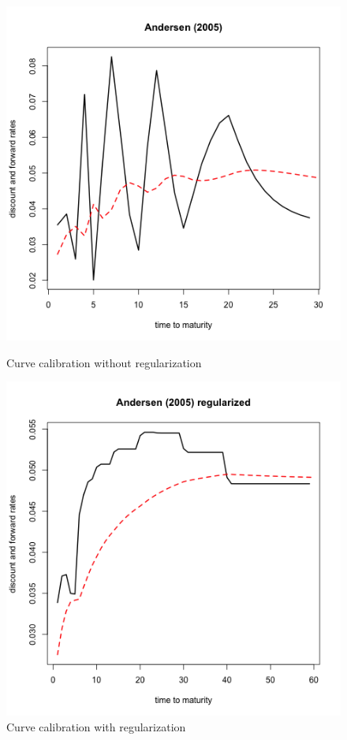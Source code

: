   \begin{figure}[!htb]
    \centering
    \begin{minipage}{.5\textwidth}
        \centering
        \includegraphics[width=1.05\linewidth, height=0.35\textheight]{gfx/chapter-yc-insurance/construction_graph7}
        \caption{Curve calibration without regularization}
        \label{fig:andersen2007examples1}
    \end{minipage}%
    \begin{minipage}{0.5\textwidth}
        \centering
        \includegraphics[width=1.05\linewidth, height=0.35\textheight]{gfx/chapter-yc-insurance/construction_graph8}
        \caption{Curve calibration with regularization}
        \label{fig:andersen2007examples2}
    \end{minipage}
  \end{figure}
  
